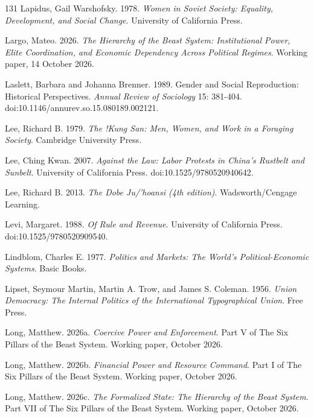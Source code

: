 \documentclass[11pt,letterpaper]{article}
\theoremstyle{definition}
\theoremstyle{remark}
\begin{document}
\begin{thebibliography}{131}
Lapidus, Gail Warshofsky. 1978. \emph{Women in Soviet Society: Equality, Development, and Social Change}. University of California Press.

Largo, Mateo. 2026. \emph{The Hierarchy of the Beast System: Institutional Power, Elite Coordination, and Economic Dependency Across Political Regimes}. Working paper, 14 October 2026.

Laslett, Barbara and Johanna Brenner. 1989. Gender and Social Reproduction: Historical Perspectives. \emph{Annual Review of Sociology} 15: 381-404. doi:10.1146/annurev.so.15.080189.002121.

Lee, Richard B. 1979. \emph{The !Kung San: Men, Women, and Work in a Foraging Society}. Cambridge University Press.

Lee, Ching Kwan. 2007. \emph{Against the Law: Labor Protests in China's Rustbelt and Sunbelt}. University of California Press. doi:10.1525/9780520940642.

Lee, Richard B. 2013. \emph{The Dobe Ju/'hoansi (4th edition)}. Wadsworth/Cengage Learning.

Levi, Margaret. 1988. \emph{Of Rule and Revenue}. University of California Press. doi:10.1525/9780520909540.

Lindblom, Charles E. 1977. \emph{Politics and Markets: The World's Political-Economic Systems}. Basic Books.

Lipset, Seymour Martin, Martin A. Trow, and James S. Coleman. 1956. \emph{Union Democracy: The Internal Politics of the International Typographical Union}. Free Press.

Long, Matthew. 2026a. \emph{Coercive Power and Enforcement}. Part V of The Six Pillars of the Beast System. Working paper, October 2026.

Long, Matthew. 2026b. \emph{Financial Power and Resource Command}. Part I of The Six Pillars of the Beast System. Working paper, October 2026.

Long, Matthew. 2026c. \emph{The Formalized State: The Hierarchy of the Beast System}. Part VII of The Six Pillars of the Beast System. Working paper, October 2026.


\end{thebibliography}
\end{document}
